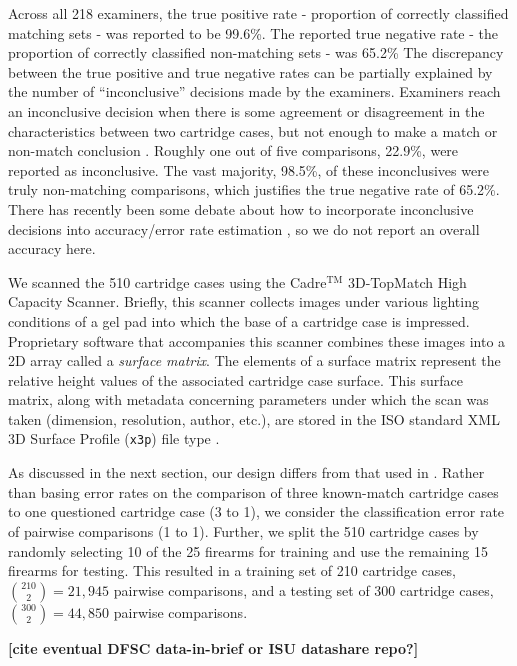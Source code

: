 \documentclass[11pt,]{isuthesis}
\begin{document}
Across all 218 examiners, the true positive rate - proportion of correctly classified matching sets - was reported to be 99.6\%.
The reported true negative rate - the proportion of correctly classified non-matching sets - was 65.2\%
The discrepancy between the true positive and true negative rates can be partially explained by the number of ``inconclusive'' decisions made by the examiners.
Examiners reach an inconclusive decision when there is some agreement or disagreement in the characteristics between two cartridge cases, but not enough to make a match or non-match conclusion \citep{AFTE1992}.
Roughly one out of five comparisons, 22.9\%, were reported as inconclusive.
The vast majority, 98.5\%, of these inconclusives were truly non-matching comparisons, which justifies the true negative rate of 65.2\%.
There has recently been some debate about how to incorporate inconclusive decisions into accuracy/error rate estimation \citep{hofmann_inconclusives_2021}, so we do not report an overall accuracy here.

We scanned the 510 cartridge cases using the Cadre\(^{\text{TM}}\) 3D-TopMatch High Capacity Scanner.
Briefly, this scanner collects images under various lighting conditions of a gel pad into which the base of a cartridge case is impressed.
Proprietary software that accompanies this scanner combines these images into a 2D array called a \emph{surface matrix}.
The elements of a surface matrix represent the relative height values of the associated cartridge case surface.
This surface matrix, along with metadata concerning parameters under which the scan was taken (dimension, resolution, author, etc.), are stored in the ISO standard XML 3D Surface Profile (\texttt{x3p}) file type \citep{ISO25178-72}.

As discussed in the next section, our design differs from that used in \citet{Baldwin2014}.
Rather than basing error rates on the comparison of three known-match cartridge cases to one questioned cartridge case (3 to 1), we consider the classification error rate of pairwise comparisons (1 to 1).
Further, we split the 510 cartridge cases by randomly selecting 10 of the 25 firearms for training and use the remaining 15 firearms for testing.
This resulted in a training set of 210 cartridge cases, \(\binom{210}{2} = 21,945\) pairwise comparisons, and a testing set of 300 cartridge cases, \(\binom{300}{2} = 44,850\) pairwise comparisons.

\textbf{{[}cite eventual DFSC data-in-brief or ISU datashare repo?{]}}
\end{document}
